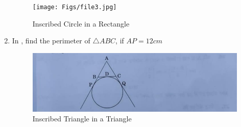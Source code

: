 \documentclass[12pt,-letter paper]{article}
\begin{document}
\begin{enumerate}
\begin{figure}[H]
\centering
\texttt{[image: Figs/file3.jpg]}
\caption{Inscribed Circle in a Rectangle}
\label{fig:Figure3}
\end{figure}
\item In , find the perimeter of $\triangle ABC$, if $AP=12cm$
\begin{figure}[H]
\centering
\includegraphics[width=\columnwidth]{Figs/file4.jpg}
\caption{Inscribed Triangle in a Triangle}                                                   
\label{fig:Figure4}
\end{figure}
\end{enumerate}
\end{document}
